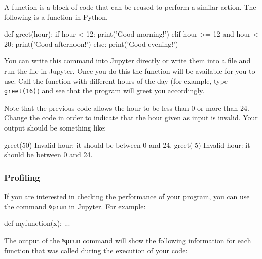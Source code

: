 A function is a block of code that can be reused to perform a similar action.
The following is a function in Python. 

\begin{python}
def greet(hour):
    if hour < 12:
        print('Good morning!')
    elif hour >= 12 and hour < 20:
        print('Good afternoon!')
    else:
        print('Good evening!')
\end{python}

You can write this command into Jupyter directly or write them into a file and run the file in Jupyter. Once you do this the function will be available for you to use. Call the function  with different hours of the day (for example, type \texttt{greet(16)}) and see that the program will greet you accordingly.

\begin{exercise}
Note that the previous code allows the hour to be less than 0 or more than 24.  Change the code in order to indicate that the hour given as input is invalid.  Your output should be something like:

\begin{python}
greet(50)
Invalid hour: it should be between 0 and 24.
greet(-5)
Invalid hour: it should be between 0 and 24.
\end{python}

\end{exercise}

\subsubsection{Profiling}

If you are interested in checking the performance of your program, you can use the command \texttt{\%prun} in Jupyter. For example:

\begin{python}
def myfunction(x):
    ...

\end{python}

The output of the \texttt{\%prun} command will show the following information
for each function that was called during the execution of your code:

